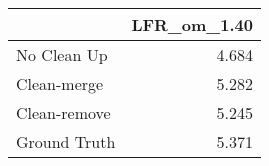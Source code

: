 \begin{tabular}{lr}
\toprule
{} & LFR_om_1.40 \\
\midrule
No Clean Up  &       4.684 \\
Clean-merge  &       5.282 \\
Clean-remove &       5.245 \\
Ground Truth &       5.371 \\
\bottomrule
\end{tabular}
